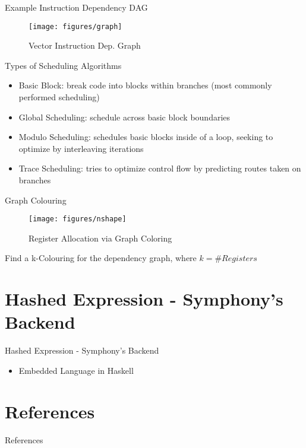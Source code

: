 \documentclass[presentation]{beamer}
\begin{document}
\begin{frame}[label={sec:org167302b}]{Example Instruction Dependency DAG}
\begin{LATEX}
\begin{figure}
\texttt{[image: figures/graph]}
\caption{Vector Instruction Dep. Graph}
\end{figure}
\end{LATEX}
\end{frame}

\begin{frame}[label={sec:org9a8ca8f}]{Types of Scheduling Algorithms}
\begin{itemize}
\item \alert{Basic Block:} break code into blocks within branches (most commonly performed scheduling)
\item \alert{Global Scheduling:} schedule across basic block boundaries
\item \alert{Modulo Scheduling:} schedules basic blocks inside of a loop, seeking to
optimize by interleaving iterations
\item \alert{Trace Scheduling:} tries to optimize control flow by predicting routes
taken on branches
\end{itemize}
\end{frame}

\begin{frame}[label={sec:orgce9bae7}]{Graph Colouring}
\begin{LATEX}
\begin{figure}
\texttt{[image: figures/nshape]}
\caption{Register Allocation via Graph Coloring}
\end{figure}
\end{LATEX}
Find a \alert{k-Colouring} for the dependency graph, where \alert{\(k = \#Registers\)}
\end{frame}

\section{Hashed Expression - Symphony's Backend}
\label{sec:org6f0721a}
\begin{frame}[label={sec:org2f7d608}]{Hashed Expression - Symphony's Backend}
\begin{itemize}
\item Embedded Language in \alert{Haskell}
\end{itemize}
\end{frame}
\section{References}
\label{sec:orgbbea773}
\begin{frame}[label={sec:orge3f83fa}]{References}
\printbibliography[heading=none]
\end{frame}
\end{document}
